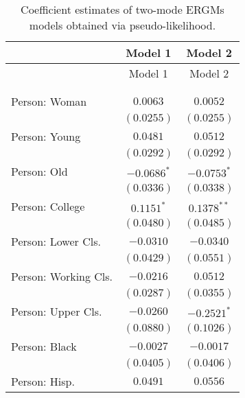
\begin{center}
\begin{longtable}{l c c}
\toprule
 & Model 1 & Model 2 \\
\midrule
\endfirsthead
\toprule
 & Model 1 & Model 2 \\
\midrule
\endhead
\bottomrule
\endfoot
\bottomrule
\multicolumn{3}{l}{\scriptsize{$^{***}p<0.001$; $^{**}p<0.01$; $^{*}p<0.05$}}\\
\caption{Coefficient estimates of two-mode ERGMs models obtained via pseudo-likelihood.}
\label{tab:reg3}
\endlastfoot \\
Person: Woman                             & $0.0063$        & $0.0052$        \\
                                          & $(0.0255)$      & $(0.0255)$      \\
Person: Young                             & $0.0481$        & $0.0512$        \\
                                          & $(0.0292)$      & $(0.0292)$      \\
Person: Old                               & $-0.0686^{*}$   & $-0.0753^{*}$   \\
                                          & $(0.0336)$      & $(0.0338)$      \\
Person: College                           & $0.1151^{*}$    & $0.1378^{**}$   \\
                                          & $(0.0480)$      & $(0.0485)$      \\
Person: Lower Cls.                        & $-0.0310$       & $-0.0340$       \\
                                          & $(0.0429)$      & $(0.0551)$      \\
Person: Working Cls.                      & $-0.0216$       & $0.0512$        \\
                                          & $(0.0287)$      & $(0.0355)$      \\
Person: Upper Cls.                        & $-0.0260$       & $-0.2521^{*}$   \\
                                          & $(0.0880)$      & $(0.1026)$      \\
Person: Black                             & $-0.0027$       & $-0.0017$       \\
                                          & $(0.0405)$      & $(0.0406)$      \\
Person: Hisp.                             & $0.0491$        & $0.0556$        \\

\end{longtable}
\end{center}
